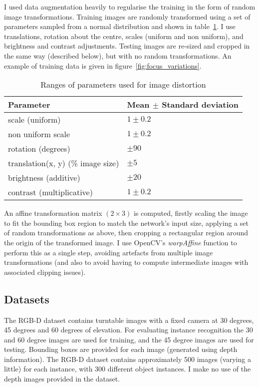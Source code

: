I used data augmentation heavily to regularise the training in the form of random image transformations. Training images are randomly transformed using a set of parameters sampled from a normal distribution and shown in table~\ref{fig:focus_jitter}.  I use translations, rotation about the centre, scales (uniform and non uniform), and brightness and contrast adjustments. Testing images are re-sized and cropped in the same way (described below), but with no random transformations. An example of training data is given in figure~\ref{fig:focus_variations}.

\begin{table}[h]
  \centering
    \caption{Ranges of parameters used for image distortion }
    
  \begin{tabular}{ l  l }
    Parameter & Mean $ \pm $ Standard deviation \\
    \toprule
    scale (uniform) & $ 1 \pm 0.2 $  \\ 
    non uniform scale  & $ 1 \pm 0.2 $  \\ 
    rotation (degrees) & $ \pm 90 $ \\ 
    translation(x, y) (\% image size) & $ \pm 5 $ \\ 
    brightness (additive) & $ \pm 20 $ \\ 
    contrast (multiplicative) & $ 1 \pm 0.2 $ \\ 
    \bottomrule
  \end{tabular}
\label{fig:focus_jitter}
\end{table}


An affine transformation matrix $ (2 \times 3) $ is computed, firstly scaling the image to fit the bounding box region to match the network's input size, applying a set of random transformations as above, then cropping a rectangular region around the origin of the transformed image. I use OpenCV's \emph{warpAffine} function to perform this as a single step, avoiding artefacts from multiple image transformations (and also to avoid having to compute intermediate images with associated clipping issues).

\subsection{Datasets}

The RGB-D \cite{Lai2011} dataset contains turntable images with a fixed camera at 30 degrees, 45 degrees and 60 degrees of elevation. For evaluating instance recognition the 30 and 60 degree images are used for training, and the 45 degree images are used for testing. Bounding boxes are provided for each image (generated using depth information). The RGB-D dataset contains approximately 500 images (varying a little) for each instance, with 300 different object instances. I make no use of the depth images provided in the dataset.

